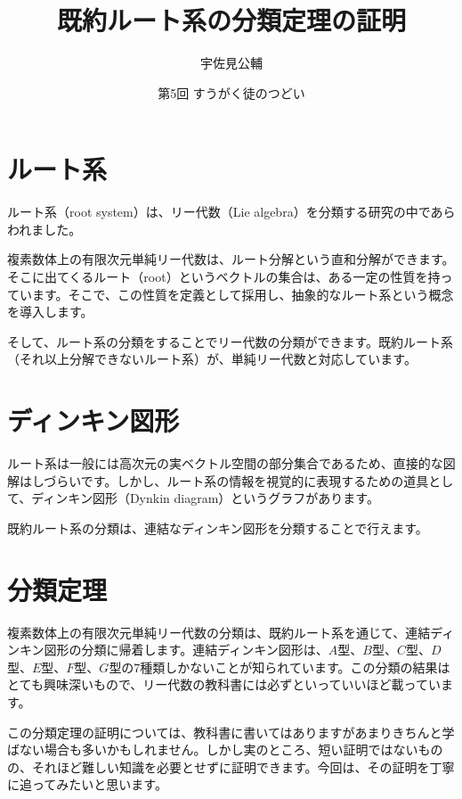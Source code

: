 \documentclass{jlreq}
\title{既約ルート系の分類定理の証明}
\author{宇佐見公輔}
\date{第5回 すうがく徒のつどい}
\begin{document}
\maketitle

\section*{ルート系}

ルート系（root system）は、リー代数（Lie algebra）を分類する研究の中であらわれました。

複素数体上の有限次元単純リー代数は、ルート分解という直和分解ができます。そこに出てくるルート（root）というベクトルの集合は、ある一定の性質を持っています。そこで、この性質を定義として採用し、抽象的なルート系という概念を導入します。

そして、ルート系の分類をすることでリー代数の分類ができます。既約ルート系（それ以上分解できないルート系）が、単純リー代数と対応しています。

\section*{ディンキン図形}

ルート系は一般には高次元の実ベクトル空間の部分集合であるため、直接的な図解はしづらいです。しかし、ルート系の情報を視覚的に表現するための道具として、ディンキン図形（Dynkin diagram）というグラフがあります。

既約ルート系の分類は、連結なディンキン図形を分類することで行えます。

\section*{分類定理}

複素数体上の有限次元単純リー代数の分類は、既約ルート系を通じて、連結ディンキン図形の分類に帰着します。連結ディンキン図形は、$A$型、$B$型、$C$型、$D$型、$E$型、$F$型、$G$型の7種類しかないことが知られています。この分類の結果はとても興味深いもので、リー代数の教科書には必ずといっていいほど載っています。

この分類定理の証明については、教科書に書いてはありますがあまりきちんと学ばない場合も多いかもしれません。しかし実のところ、短い証明ではないものの、それほど難しい知識を必要とせずに証明できます。今回は、その証明を丁寧に追ってみたいと思います。
\end{document}
